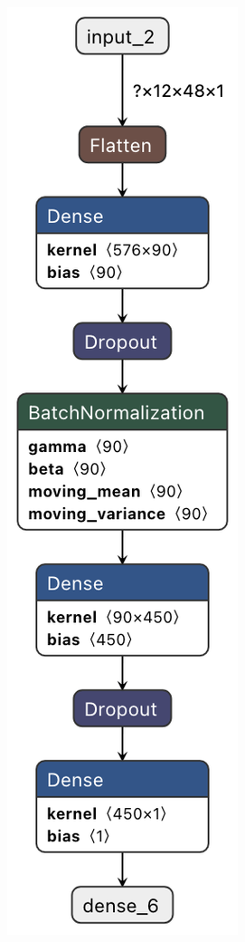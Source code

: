 \begin{figure}
  \begin{subfigure}[t]{.155\textwidth}
    \centering
    \includegraphics[width=\linewidth]{figures/regression/model_3-3.png}

\end{subfigure}
\end{figure}

